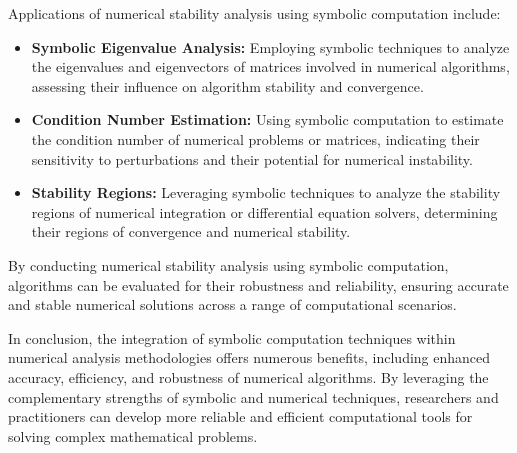Applications of numerical stability analysis using symbolic computation include:
%
\begin{itemize}
  \setlength{\itemsep}{0.0em}
  \item \textbf{Symbolic Eigenvalue Analysis:} Employing symbolic techniques to analyze the eigenvalues and eigenvectors of matrices involved in numerical algorithms, assessing their influence on algorithm stability and convergence.
  \item \textbf{Condition Number Estimation:} Using symbolic computation to estimate the condition number of numerical problems or matrices, indicating their sensitivity to perturbations and their potential for numerical instability.
  \item \textbf{Stability Regions:} Leveraging symbolic techniques to analyze the stability regions of numerical integration or differential equation solvers, determining their regions of convergence and numerical stability.
\end{itemize}
%
By conducting numerical stability analysis using symbolic computation, algorithms can be evaluated for their robustness and reliability, ensuring accurate and stable numerical solutions across a range of computational scenarios.

In conclusion, the integration of symbolic computation techniques within numerical analysis methodologies offers numerous benefits, including enhanced accuracy, efficiency, and robustness of numerical algorithms. By leveraging the complementary strengths of symbolic and numerical techniques, researchers and practitioners can develop more reliable and efficient computational tools for solving complex mathematical problems.

